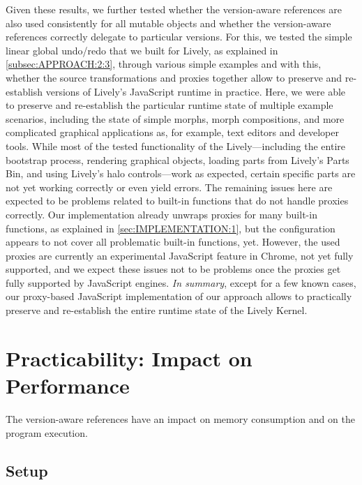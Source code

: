 Given these results, we further tested whether the version-aware references are also used consistently for all mutable objects and whether the version-aware references correctly delegate to particular versions.
For this, we tested the simple linear global undo/redo that we built for Lively, as explained in \ref{subsec:APPROACH:2:3}, through various simple examples and with this, whether the source transformations and proxies together allow to preserve and re-establish versions of Lively's JavaScript runtime in practice.
Here, we were able to preserve and re-establish the particular runtime state of multiple example scenarios, including the state of simple morphs, morph compositions, and more complicated graphical applications as, for example, text editors and developer tools.
While most of the tested functionality of the Lively---including the entire bootstrap process, rendering graphical objects, loading parts from Lively's Parts Bin, and using Lively's halo controls---work as expected, certain specific parts are not yet working correctly or even yield errors.
The remaining issues here are expected to be problems related to built-in functions that do not handle proxies correctly.
Our implementation already unwraps proxies for many built-in functions, as explained in \ref{sec:IMPLEMENTATION:1}, but the configuration appears to not cover all problematic built-in functions, yet.
However, the used proxies are currently an experimental JavaScript feature in Chrome, not yet fully supported, and we expect these issues not to be problems once the proxies get fully supported by JavaScript engines.
\emph{In summary}, except for a few known cases, our proxy-based JavaScript implementation of our approach allows to practically preserve and re-establish the entire runtime state of the Lively Kernel.


\section{Practicability: Impact on Performance} \label{sec:DISCUSSION:2}

The version-aware references have an impact on memory consumption and on the program execution.

\subsection{Setup}

